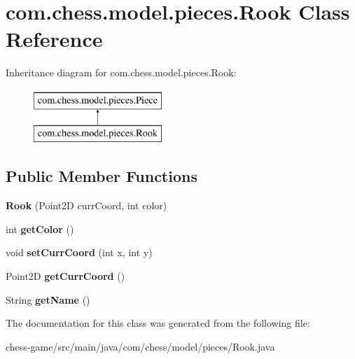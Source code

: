 \hypertarget{classcom_1_1chess_1_1model_1_1pieces_1_1_rook}{}\section{com.\+chess.\+model.\+pieces.\+Rook Class Reference}
\label{classcom_1_1chess_1_1model_1_1pieces_1_1_rook}
Inheritance diagram for com.\+chess.\+model.\+pieces.\+Rook\+:\begin{figure}[H]
\begin{center}
\leavevmode
\includegraphics[height=2.000000cm]{classcom_1_1chess_1_1model_1_1pieces_1_1_rook}
\end{center}
\end{figure}
\subsection*{Public Member Functions}
\begin{DoxyCompactItemize}
\item 
\mbox{\label{classcom_1_1chess_1_1model_1_1pieces_1_1_rook_aba032c22f8f4ff8c83fa9a3b33571337}} 
{\bfseries Rook} (Point2D curr\+Coord, int color)
\item 
\mbox{\label{classcom_1_1chess_1_1model_1_1pieces_1_1_rook_a3829444753d58c9ebc492a1cfa6876ca}} 
int {\bfseries get\+Color} ()
\item 
\mbox{\label{classcom_1_1chess_1_1model_1_1pieces_1_1_rook_a0bbae5a09cc41c76e986dab649a1723d}} 
void {\bfseries set\+Curr\+Coord} (int x, int y)
\item 
\mbox{\label{classcom_1_1chess_1_1model_1_1pieces_1_1_rook_a5affbf1ed38a32181e67eac11d1c0ee9}} 
Point2D {\bfseries get\+Curr\+Coord} ()
\item 
\mbox{\label{classcom_1_1chess_1_1model_1_1pieces_1_1_rook_a0a830fcbb4811070c5874e4cf930bbc2}} 
String {\bfseries get\+Name} ()
\end{DoxyCompactItemize}


The documentation for this class was generated from the following file\+:\begin{DoxyCompactItemize}
\item 
chess-\/game/src/main/java/com/chess/model/pieces/Rook.\+java\end{DoxyCompactItemize}
